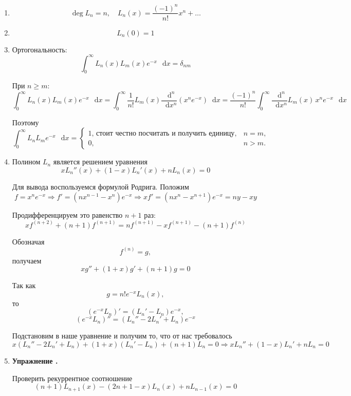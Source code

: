\documentclass[11pt,a4paper]{report}
\numberwithin{equation}{section}
\numberwithin{figure}{chapter}
\numberwithin{table}{chapter}
\newif\ifinmathphysstatement
\newenvironment{myexe}[1][]{%
    \refstepcounter{exectr}%
    \inmathphysstatementtrue
    \begin{tcolorbox}[mathphysblock,colframe=exercisecolor,colback=exercisecolor!3,#1]
    \textbf{\color{exercisecolor}Упражнение \theexectr.}\par\smallskip
}{%
    \end{tcolorbox}
    \inmathphysstatementfalse
}
\newcommand{\dd}{\mathop{}\!\mathrm{d}}
\begin{document}
\begin{enumerate}
    \item
    \[
    \deg L_n=n,\quad L_n(x)
    =
    \frac{(-1)^n}{n!}x^n+\ldots
    \]

    \item
    \[
    L_n(0)=1
    \]

    \item Ортогональность:
    \[
    \int_0^\infty
    L_n(x)L_m(x)e^{-x}\,\dd x
    =
    \delta_{nm}
    \]

    При $n\ge m$:
    \[
    \int_0^\infty
    L_n(x)L_m(x)e^{-x}\,\dd x
    =
    \int_0^\infty
    \frac{1}{n!}L_m(x)
    \frac{\dd^n}{\dd x^n}
    \left(x^ne^{-x}\right)\dd x
    =
    \frac{(-1)^n}{n!}
    \int_0^\infty
    \frac{\dd^n}{\dd x^n}L_m(x)\,
    x^ne^{-x}\,\dd x
    \]

    Поэтому
    \[
    \int_0^\infty
    L_nL_m e^{-x}\,\dd x
    =
    \begin{cases}
    1,\,\text{стоит честно посчитать и получить единицу},  & n=m,\\
    0, & n>m.
    \end{cases}
    \]

    \item Полином $L_n$ является решением уравнения
    \[
    xL_n''(x)+(1-x)L_n'(x)+nL_n(x)=0
    \]

    Для вывода воспользуемся формулой Родрига. Положим
    \[
    f=x^ne^{-x}\Rightarrow
    f'=(nx^{n-1}-x^n)e^{-x}\Rightarrow
    xf'
    =
    (nx^n-x^{n+1})e^{-x}
    =
    ny-xy
    \]

    Продифференцируем это равенство $n+1$ раз:
    \[
    xf^{(n+2)}+(n+1)f^{(n+1)}
    =
    nf^{(n+1)}
    -
    xf^{(n+1)}
    -
    (n+1)f^{(n)}
    \]

    Обозначая
    \[
    f^{(n)}=g,
    \]
    получаем
    \[
    xg''+(1+x)g'+(n+1)g=0
    \]

    Так как
    \[
    g=n!e^{-x}L_n(x),
    \]
    то
    \[
    (e^{-x}L_n)'=(L_n'-L_n)e^{-x},
    \]
    \[
    (e^{-x}L_n)''
    =
    (L_n''-2L_n'+L_n)e^{-x}
    \]

    Подстановим в наше уравнение и получим то, что от нас требовалось
    \[
    x(L_n''-2L_n'+L_n)
    +(1+x)(L_n'-L_n)
    +(n+1)L_n=0\Rightarrow
    xL_n''+(1-x)L_n'+nL_n=0
    \]

    \item
    \begin{myexe}
    Проверить рекуррентное соотношение
    \[
    (n+1)L_{n+1}(x)
    -
    (2n+1-x)L_n(x)
    +
    nL_{n-1}(x)
    =
    0
    \]
    \end{myexe}

    
\end{enumerate}
\end{document}
